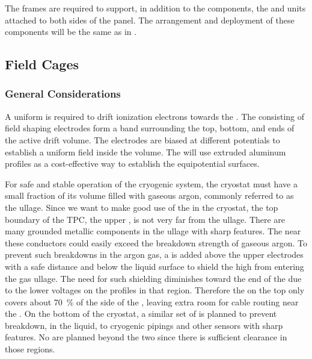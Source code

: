 The  frames are required to support, in addition to the  components, the  and  units attached to both sides of the  panel. The arrangement and deployment of these components will be the same as in .  
\subsection{Field Cages}
\subsubsection{General Considerations}

A uniform \efield{} is required to drift ionization electrons towards the . The  consisting of field shaping electrodes form a band surrounding the top, bottom, and ends of the active drift volume. The electrodes are biased at different potentials to establish a uniform field inside the  volume.
The  will use extruded aluminum profiles as a cost-effective way to establish the equipotential surfaces. 

For safe and stable operation of the \lar cryogenic system, the cryostat must have a small fraction of its volume filled with gaseous argon, commonly referred to as the ullage. Since we want to make good use of the \lar in the cryostat, the top boundary of the TPC, the upper , is not very far from the ullage. There are many grounded metallic components in the ullage with sharp features.  The \efield near these conductors could easily exceed the breakdown strength of gaseous argon. To prevent such breakdowns in the argon gas, a  is added above the upper  electrodes with a safe distance and below the liquid surface to shield the high \efield from entering the gas ullage.  The need for such shielding diminishes toward the  end of the  due to the lower voltages on the  profiles in that region. Therefore the  on the top only covers about \SI{70}{\%} of the  side of the , leaving extra room for cable routing near the .
On the bottom of the cryostat, a similar set of  is planned to prevent breakdown, in the liquid, to cryogenic pipings and other sensors with sharp features.  No  are planned beyond the two  since there is sufficient clearance in those regions.  

